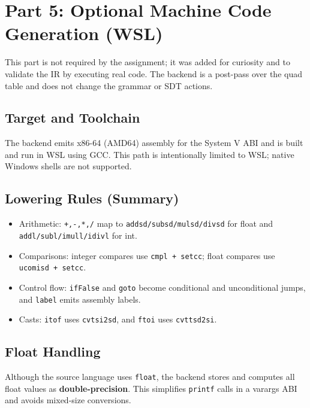 \documentclass[11pt]{article}
\begin{document}
\section{Part 5: Optional Machine Code Generation (WSL)}

This part is not required by the assignment; it was added for curiosity and to validate the IR by executing real code. The backend is a post-pass over the quad table and does not change the grammar or SDT actions.

\subsection{Target and Toolchain}

The backend emits x86-64 (AMD64) assembly for the System V ABI and is built and run in WSL using GCC. This path is intentionally limited to WSL; native Windows shells are not supported.

\subsection{Lowering Rules (Summary)}

\begin{itemize}
    \item Arithmetic: \texttt{+,-,*,/} map to \texttt{addsd/subsd/mulsd/divsd} for float and \texttt{addl/subl/imull/idivl} for int.
    \item Comparisons: integer compares use \texttt{cmpl + setcc}; float compares use \texttt{ucomisd + setcc}.
    \item Control flow: \texttt{ifFalse} and \texttt{goto} become conditional and unconditional jumps, and \texttt{label} emits assembly labels.
    \item Casts: \texttt{itof} uses \texttt{cvtsi2sd}, and \texttt{ftoi} uses \texttt{cvttsd2si}.
\end{itemize}

\subsection{Float Handling}

Although the source language uses \texttt{float}, the backend stores and computes all float values as \textbf{double-precision}. This simplifies \texttt{printf} calls in a varargs ABI and avoids mixed-size conversions.
\end{document}
